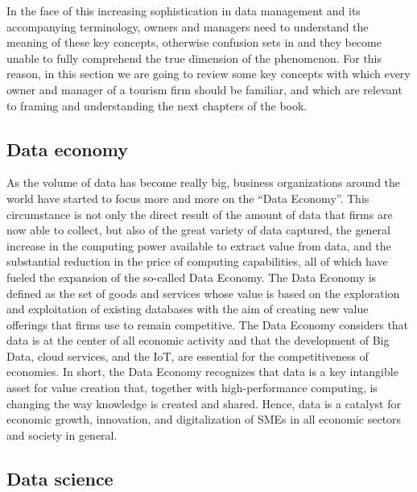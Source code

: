 \documentclass[
  letterpaper,
  DIV=11,
  numbers=noendperiod]{scrreprt}
\begin{document}
In the face of this increasing sophistication in data management and its
accompanying terminology, owners and managers need to understand the
meaning of these key concepts, otherwise confusion sets in and they
become unable to fully comprehend the true dimension of the phenomenon.
For this reason, in this section we are going to review some key
concepts with which every owner and manager of a tourism firm should be
familiar, and which are relevant to framing and understanding the next
chapters of the book.

\hypertarget{data-economy}{%
\subsection{Data economy}\label{data-economy}}

As the volume of data has become really big, business organizations
around the world have started to focus more and more on the ``Data
Economy''. This circumstance is not only the direct result of the amount
of data that firms are now able to collect, but also of the great
variety of data captured, the general increase in the computing power
available to extract value from data, and the substantial reduction in
the price of computing capabilities, all of which have fueled the
expansion of the so-called Data Economy. The Data Economy is defined as
the set of goods and services whose value is based on the exploration
and exploitation of existing databases with the aim of creating new
value offerings that firms use to remain competitive. The Data Economy
considers that data is at the center of all economic activity and that
the development of Big Data, cloud services, and the IoT, are essential
for the competitiveness of economies. In short, the Data Economy
recognizes that data is a key intangible asset for value creation that,
together with high-performance computing, is changing the way knowledge
is created and shared. Hence, data is a catalyst for economic growth,
innovation, and digitalization of SMEs in all economic sectors and
society in general.

\hypertarget{data-science}{%
\subsection{Data science}\label{data-science}}
\end{document}
